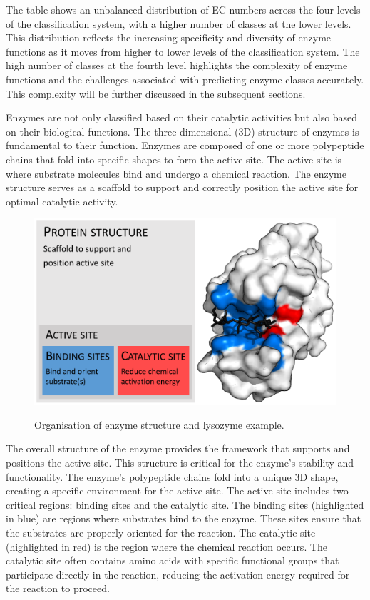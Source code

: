The table shows an unbalanced distribution of EC numbers across the four levels of the classification system, with a higher number of classes at the lower levels. This distribution reflects the increasing specificity and diversity of enzyme functions as it moves from higher to lower levels of the classification system. The high number of classes at the fourth level highlights the complexity of enzyme functions and the challenges associated with predicting enzyme classes accurately. This complexity will be further discussed in the subsequent sections.

Enzymes are not only classified based on their catalytic activities but also based on their biological functions. The three-dimensional (3D) structure of enzymes is fundamental to their function. Enzymes are composed of one or more polypeptide chains that fold into specific shapes to form the active site. The active site is where substrate molecules bind and undergo a chemical reaction. The enzyme structure serves as a scaffold to support and correctly position the active site for optimal catalytic activity.

\begin{figure}[hbt]
    \centering
    \begin{minipage}[t]{\textwidth}
    \caption{Organisation of enzyme structure and lysozyme example.}
    \includegraphics[width=.7\textwidth]{img/EnzymeStructure.svg.png}\\
    \label{fig:EnzymeStructure}
    \end{minipage}
\end{figure}

The overall structure of the enzyme provides the framework that supports and positions the active site. This structure is critical for the enzyme's stability and functionality. The enzyme's polypeptide chains fold into a unique 3D shape, creating a specific environment for the active site.
The active site includes two critical regions: binding sites and the catalytic site. The binding sites (highlighted in blue) are regions where substrates bind to the enzyme. These sites ensure that the substrates are properly oriented for the reaction. The catalytic site (highlighted in red) is the region where the chemical reaction occurs. The catalytic site often contains amino acids with specific functional groups that participate directly in the reaction, reducing the activation energy required for the reaction to proceed.

